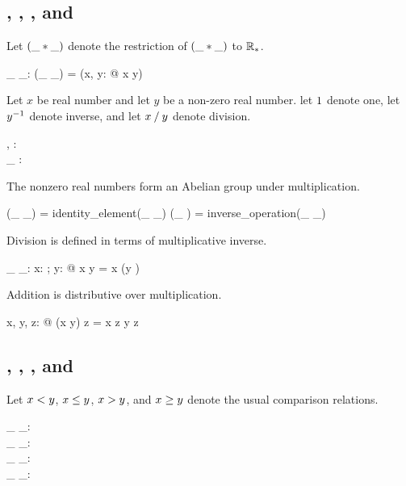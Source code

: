 \documentclass[11pt, oneside]{article}
\begin{document}
\subsection{, , , and }

Let $(\_ \mathbin{*} \_)$ denote the restriction of $(\_ \mathbin{*} \_)$ to $\mathbb{R}_{*}$.

\begin{axdef}
	\_ \mulRnz \_: \Rnz \cross \Rnz \fun \Rnz
	\where
	(\_ \mulRnz \_) = (\lambda x, y: \Rnz @ x \mulR y)
\end{axdef}

Let $x$ be real number and let $y$ be a non-zero real number.
let $1$ denote one,
let $y ^{-1}$ denote inverse,
and let $x \mathbin{/} y$ denote division.

\begin{axdef}
	\oneR, \twoR: \Rnz \\
	\_ \invRnz: \Rnz \fun \Rnz
\end{axdef}

The nonzero real numbers form an Abelian group under multiplication.

\begin{zed}
(\_ \mulRnz \_) \in \abgroup \Rnz
\also
\oneR = identity\_element(\_ \mulRnz \_)
\also
(\_ \invRnz) = inverse\_operation(\_ \mulRnz \_)
\end{zed}

Division is defined in terms of multiplicative inverse.

\begin{axdef}
	\_ \divR \_: \R \cross \Rnz \fun \R
	\where
	\forall x: \R; y: \Rnz @ x \divR y = x \mulR (y \invRnz)
\end{axdef}

Addition is distributive over multiplication.

\begin{zed}
	\forall x, y, z: \R @ (x \addR y) \mulR z = x \mulR z \addR y \mulR z
\end{zed}

\subsection{, , , and }

Let $x \mathrel{<} y$, $x \mathrel{\leq} y$, $x \mathrel{>} y$, and $x \mathrel{\geq} y$ denote the usual comparison relations.

\begin{axdef}
	\_ \ltR \_: \R \rel \R \\
	\_ \leR \_: \R \rel \R \\
	\_ \gtR \_: \R \rel \R \\
	\_ \geR \_: \R \rel \R
\end{axdef}
\end{document}
